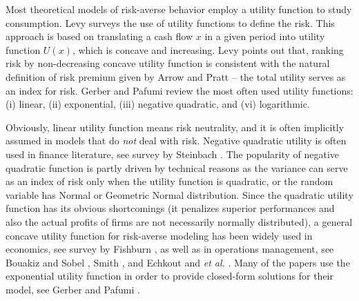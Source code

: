 \documentclass[mnsc,nonblindrev,copyedit]{informs2_wz} %
\begin{document}
\medskip

Most theoretical models of risk-averse behavior employ a utility function to study consumption.  Levy \cite{Levy92} surveys the use of utility functions to define the risk.  This approach is based on translating a cash flow $x$ in a given period into utility function $U(x)$, which is concave and increasing.  Levy points out that, ranking risk by non-decreasing concave utility function is consistent with the natural definition of risk premium given by Arrow \cite{Arrow1951} and Pratt \cite{Pratt1964} -- the total utility serves as an index for risk.  Gerber and Pafumi \cite{Gerber1998} review the most often used utility functions: (i) linear, (ii) exponential, (iii) negative quadratic, and (vi) logarithmic.

Obviously, linear utility function means risk neutrality, and it is often implicitly assumed in models that do \emph{not} deal with risk.  Negative quadratic utility is often used in finance literature, see survey by Steinbach \cite{Steinbach2001}.  The popularity of negative quadratic function is partly driven by technical reasons as the variance can serve as an index of risk only when the utility function is quadratic, or the random variable has Normal or Geometric Normal distribution.  Since the quadratic utility function has its obvious shortcomings (it penalizes superior performances and also the actual profits of firms are not necessarily normally distributed), a general concave utility function for risk-averse modeling has been widely used in economics, see survey by Fishburn \cite{Fishburn1989}, as well as in operations management, see Bouakiz and Sobel \cite{Bouakiz1992}, Smith \cite{Smith1998}, and Echkout and {\it et al.} \cite{Eeckhoudt1995}.  Many of the papers use the exponential utility function in order to provide closed-form solutions for their model, see Gerber and Pafumi \cite{Gerber1998}.
\end{document}

